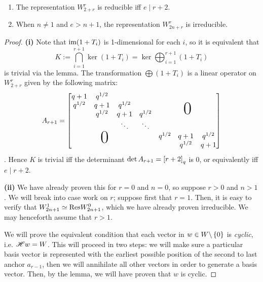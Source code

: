 \documentclass{amsart}
\begin{document}
\begin{proposition}
  \;

  \begin{enumerate}[label={(\roman*)}]
    \item The representation $W_{2+r}^r$ is reducible iff $e \mid r+2$.
    \item When $n \neq 1$ and $e > n+1$, the representation $W_{2n + r}^r$ is irreducible.
  \end{enumerate}
\end{proposition}
\begin{proof}
  \def\sectionsep{7pt}
  \textbf{(i)}
  Note that $\text{im} (1 + T_i)$ is 1-dimensional for each $i$, so it is equivalent that 
  \[K := \bigcap_{i=1}^{r+1} \ker(1 + T_i) = \ker \bigoplus_{i=1}^{r+1} (1 + T_i)\] 
  is trivial via the lemma.
  The transformation $\bigoplus (1 + T_i)$ is a linear operator on $W_{2 + r}^r$ given by the following matrix:
  \newcommand*\bigzero{\makebox(0,15){\text{\Huge0}}}
  \newcommand*\bigzerotwo{\makebox(-20,15){\text{\Huge0}}}
  \[
    A_{r + 1} = 
    \begin{bmatrix}
      \begin{matrix}
      q + 1 & q^{1/2} & \\
      q^{1/2} & q + 1 & q^{1/2}\\
      & q^{1/2} & q + 1 & q^{1/2}\\
      &  & \ddots & \ddots
      \end{matrix}
      &   \bigzero\\
      \bigzerotwo & \begin{matrix}
        q^{1/2} & q+1 & q^{1/2}\\
        &  q^{1/2} & q + 1
       \end{matrix}
    \end{bmatrix}
  \].
  Hence $K$ is trivial iff the determinant $\det A_{r + 1} = \left[ r + 2 \right]_q$ is 0, or equivalently iff $e \mid r + 2$.

  \iffalse %
  \vspace{\sectionsep}
  \textbf{(ii)}
  We have already proven this for $r = 0$ and $n = 0$, so suppose $r > 0$ and $n > 1$.
  We will break into case work on $r$;
  suppose first that $r = 1$.
  Then, it is easy to verify that $W_{2n + 1}^1 \simeq \text{Res} W_{2n + 1}^0$, which we have already proven irreducible.
  We may henceforth assume that $r > 1$.

  We will prove the equivalent condition that each vector in $w \in W\backslash \left\{ 0 \right\}$ is \emph{cyclic}, i.e. $\mathscr{H} w = W$.
  This will proceed in two steps: we will make sure a particular basis vector is represented with the earliest possible position of the second to last anchor $a_{r-1}$, then we will annihilate all other vectors in order to generate a basis vector.
  Then, by the lemma, we will have proven that $w$ is cyclic.


\end{proof}
\end{document}
